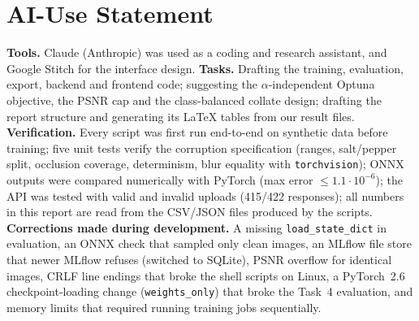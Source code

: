 \documentclass[conference]{IEEEtran}
\begin{document}
\appendices
\section{AI-Use Statement}
\textbf{Tools.} Claude (Anthropic) was used as a coding and research assistant, and Google Stitch for the interface design. \textbf{Tasks.} Drafting the training, evaluation, export, backend and frontend code; suggesting the $\alpha$-independent Optuna objective, the PSNR cap and the class-balanced collate design; drafting the report structure and generating its LaTeX tables from our result files. \textbf{Verification.} Every script was first run end-to-end on synthetic data before training; five unit tests verify the corruption specification (ranges, salt/pepper split, occlusion coverage, determinism, blur equality with \texttt{torchvision}); ONNX outputs were compared numerically with PyTorch (max error $\le1.1\cdot10^{-6}$); the API was tested with valid and invalid uploads (415/422 responses); all numbers in this report are read from the CSV/JSON files produced by the scripts. \textbf{Corrections made during development.} A missing \texttt{load\_state\_dict} in evaluation, an ONNX check that sampled only clean images, an MLflow file store that newer MLflow refuses (switched to SQLite), PSNR overflow for identical images, CRLF line endings that broke the shell scripts on Linux, a PyTorch~2.6 checkpoint-loading change (\texttt{weights\_only}) that broke the Task~4 evaluation, and memory limits that required running training jobs sequentially.
\end{document}
